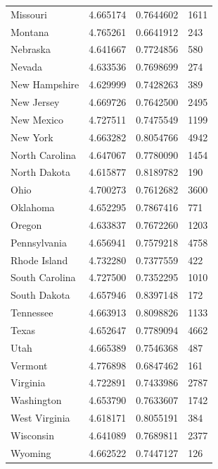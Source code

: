\documentclass[
  english,
  man]{apa6}
\begin{document}
\begin{landscape}
\begin{longtable}[t]{llll}
Missouri & 4.665174 & 0.7644602 & 1611\\
\addlinespace
Montana & 4.765261 & 0.6641912 & 243\\
Nebraska & 4.641667 & 0.7724856 & 580\\
Nevada & 4.633536 & 0.7698699 & 274\\
New Hampshire & 4.629999 & 0.7428263 & 389\\
New Jersey & 4.669726 & 0.7642500 & 2495\\
\addlinespace
New Mexico & 4.727511 & 0.7475549 & 1199\\
New York & 4.663282 & 0.8054766 & 4942\\
North Carolina & 4.647067 & 0.7780090 & 1454\\
North Dakota & 4.615877 & 0.8189782 & 190\\
Ohio & 4.700273 & 0.7612682 & 3600\\
\addlinespace
Oklahoma & 4.652295 & 0.7867416 & 771\\
Oregon & 4.633837 & 0.7672260 & 1203\\
Pennsylvania & 4.656941 & 0.7579218 & 4758\\
Rhode Island & 4.732280 & 0.7377559 & 422\\
South Carolina & 4.727500 & 0.7352295 & 1010\\
\addlinespace
South Dakota & 4.657946 & 0.8397148 & 172\\
Tennessee & 4.663913 & 0.8098826 & 1133\\
Texas & 4.652647 & 0.7789094 & 4662\\
Utah & 4.665389 & 0.7546368 & 487\\
Vermont & 4.776898 & 0.6847462 & 161\\
\addlinespace
Virginia & 4.722891 & 0.7433986 & 2787\\
Washington & 4.653790 & 0.7633607 & 1742\\
West Virginia & 4.618171 & 0.8055191 & 384\\
Wisconsin & 4.641089 & 0.7689811 & 2377\\
Wyoming & 4.662522 & 0.7447127 & 126\\*
\end{longtable}
\end{landscape}
\endgroup{}

\begingroup\fontsize{12}{14}\selectfont
\end{document}
